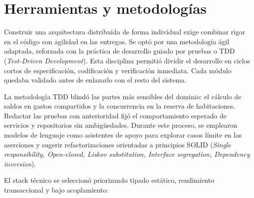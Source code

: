 \chapter{Herramientas y metodologías}
\label{chap:herramientas_y_metodologias}

    Construir una arquitectura distribuida de forma individual exige combinar rigor en el código con agilidad en las entregas. Se optó por una metodología ágil adaptada, reforzada con la práctica de desarrollo guiado por pruebas o TDD (\emph{Test-Driven Development}). Esta disciplina permitió dividir el desarrollo en ciclos cortos de especificación, codificación y verificación inmediata. Cada módulo quedaba validado antes de enlazarlo con el resto del sistema.

    La metodología TDD blindó las partes más sensibles del dominio: el cálculo de saldos en gastos compartidos y la concurrencia en la reserva de habitaciones. Redactar las pruebas con anterioridad fijó el comportamiento esperado de servicios y repositorios sin ambigüedades. Durante este proceso, se emplearon modelos de lenguaje como asistentes de apoyo para explorar casos límite en las aserciones y sugerir refactorizaciones orientadas a principios SOLID (\emph{Single responsibility, Open-closed, Liskov substitution, Interface segregation, Dependency inversion}).

    El stack técnico se seleccionó priorizando tipado estático, rendimiento transaccional y bajo acoplamiento:


